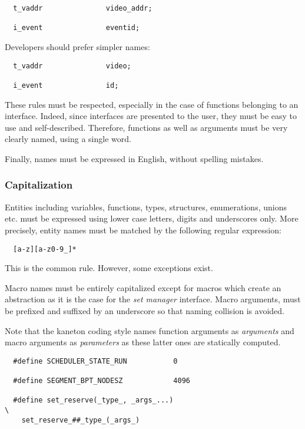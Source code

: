 \begin{verbatim}
  t_vaddr               video_addr;

  i_event               eventid;
\end{verbatim}

Developers should prefer simpler names:

\begin{verbatim}
  t_vaddr               video;

  i_event               id;
\end{verbatim}

These rules must be respected, especially in the case of functions belonging
to an interface. Indeed, since interfaces are presented to the user, they
must be easy to use and self-described. Therefore, functions as well as
arguments must be very clearly named, using a single word.

Finally, names must be expressed in English, without spelling mistakes.


\subsubsection{Capitalization}

Entities including variables, functions, types, structures, enumerations,
unions etc. must be expressed using lower case letters, digits and underscores
only. More precisely, entity names must be matched by the following
regular expression:

\begin{verbatim}
  [a-z][a-z0-9_]*
\end{verbatim}

This is the common rule. However, some exceptions exist.

Macro names must be entirely capitalized except for macros which create
an abstraction as it is the case for the \textit{set manager} interface. Macro
arguments, must be prefixed and suffixed by an underscore so that naming
collision is avoided.

Note that the kaneton coding style names function arguments as
\textit{arguments} and macro arguments as \textit{parameters} as these
latter ones are statically computed.

\begin{verbatim}
  #define SCHEDULER_STATE_RUN           0

  #define SEGMENT_BPT_NODESZ            4096

  #define set_reserve(_type_, _args_...)                                \
    set_reserve_##_type_(_args_)
\end{verbatim}

